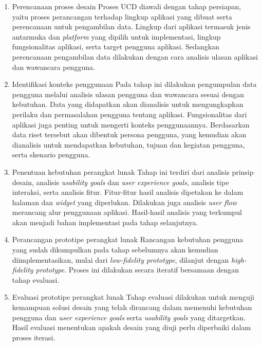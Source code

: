 \begin{enumerate}
  \item Perencanaan proses desain
  \subitem Proses UCD diawali dengan tahap persiapan, yaitu proses perancangan terhadap lingkup aplikasi yang dibuat serta perencanaan untuk pengambilan data. Lingkup dari aplikasi termasuk jenis antarmuka dan \textit{platform} yang dipilih untuk implementasi, lingkup fungsionalitas aplikasi, serta target pengguna aplikasi. Sedangkan perencanaan pengambilan data dilakukan dengan cara analisis ulasan aplikasi dan wawancara pengguna.

  \item Identifikasi konteks penggunaan
  \subitem Pada tahap ini dilakukan pengumpulan data pengguna melalui analisis ulasan pengguna dan wawancara sesuai dengan kebutuhan. Data yang didapatkan akan dianalisis untuk mengungkapkan perilaku dan permasalahan pengguna tentang aplikasi. Fungsionalitas dari aplikasi juga penting untuk mengerti konteks penggunaannya. Berdasarkan data riset tersebut akan dibentuk persona pengguna, yang kemudian akan dianalisis untuk mendapatkan kebutuhan, tujuan dan kegiatan pengguna, serta skenario pengguna.
   
  \item Penentuan kebutuhan perangkat lunak
  \subitem Tahap ini terdiri dari analisis prinsip desain, analisis \textit{usability goals} dan \textit{user experience goals}, analisis tipe interaksi, serta analisis fitur. Fitur-fitur hasil analisis dipetakan ke dalam halaman dan \textit{widget} yang diperlukan. Dilakukan juga analisis \textit{user flow} merancang alur penggunaan aplikasi. Hasil-hasil analisis yang terkumpul akan menjadi bahan implementasi pada tahap selanjutnya.
  
  \item Perancangan prototipe perangkat lunak
  \subitem Rancangan kebutuhan pengguna yang sudah dikumpulkan pada tahap sebelumnya akan kemudian diimplementasikan, mulai dari \textit{low-fidelity prototype}, dilanjut dengan \textit{high-fidelity prototype}. Proses ini dilakukan secara iteratif bersamaan dengan tahap evaluasi.
  
  \item Evaluasi prototipe perangkat lunak
  \subitem Tahap evaluasi dilakukan untuk menguji kemampuan solusi desain yang telah dirancang dalam memenuhi kebutuhan pengguna dan \textit{user experience goals} serta \textit{usability goals} yang ditargetkan. Hasil evaluasi menentukan apakah desain yang diuji perlu diperbaiki dalam proses iterasi.

  
\end{enumerate}


